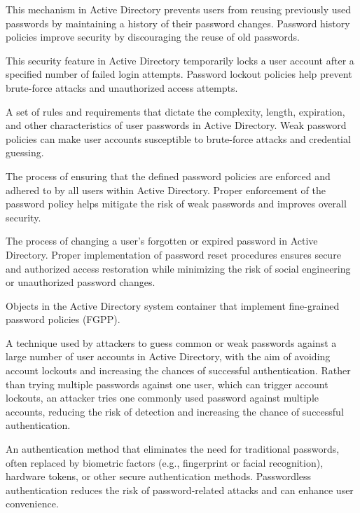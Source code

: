  This mechanism in Active Directory prevents users from reusing previously used passwords by maintaining a history of their password changes. Password history policies improve security by discouraging the reuse of old passwords.

 This security feature in Active Directory temporarily locks a user account after a specified number of failed login attempts. Password lockout policies help prevent brute-force attacks and unauthorized access attempts.

 A set of rules and requirements that dictate the complexity, length, expiration, and other characteristics of user passwords in Active Directory. Weak password policies can make user accounts susceptible to brute-force attacks and credential guessing.

 The process of ensuring that the defined password policies are enforced and adhered to by all users within Active Directory. Proper enforcement of the password policy helps mitigate the risk of weak passwords and improves overall security.

 The process of changing a user’s forgotten or expired password in Active Directory. Proper implementation of password reset procedures ensures secure and authorized access restoration while minimizing the risk of social engineering or unauthorized password changes.

 Objects in the Active Directory system container that implement fine-grained password policies (FGPP).

 A technique used by attackers to guess common or weak passwords against a large number of user accounts in Active Directory, with the aim of avoiding account lockouts and increasing the chances of successful authentication. Rather than trying multiple passwords against one user, which can trigger account lockouts, an attacker tries one commonly used password against multiple accounts, reducing the risk of detection and increasing the chance of successful authentication.

 An authentication method that eliminates the need for traditional passwords, often replaced by biometric factors (e.g., fingerprint or facial recognition), hardware tokens, or other secure authentication methods. Passwordless authentication reduces the risk of password-related attacks and can enhance user convenience.

